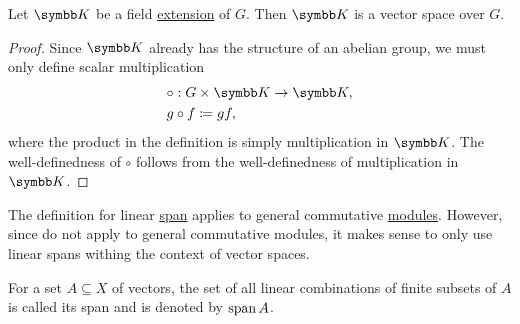 \begin{Proposition}\label{thm:field_extension_is_vector_space}
  Let \( \BK \) be a field \hyperref[def:field_extension]{extension} of \( G \). Then \( \BK \) is a vector space over \( G \).
\end{Proposition}
\begin{proof}
  Since \( \BK \) already has the structure of an abelian group, we must only define scalar multiplication
  \begin{align*}
    &\circ: G \times \BK \to \BK, \\
    &g \circ f \coloneqq gf,
  \end{align*}
  where the product in the definition is simply multiplication in \( \BK \). The well-definedness of \( \circ \) follows from the well-definedness of multiplication in \( \BK \).
\end{proof}

\begin{Remark}\label{remark:linear_span_only_for_vector_spaces}
  The definition for linear \hyperref[def:linear_span]{span} applies to general commutative \hyperref[def:left_module]{modules}. However, since  do not apply to general commutative modules, it makes sense to only use linear spans withing the context of vector spaces.
\end{Remark}

\begin{Definition}\label{def:linear_span}
  For a set \( A \subseteq X \) of vectors, the set of all linear combinations of finite subsets of \( A \) is called its span and is denoted by \( \operatorname{span}{A} \).
\end{Definition}

